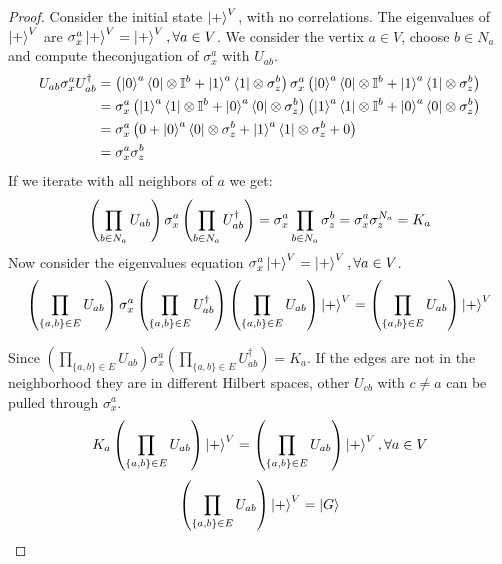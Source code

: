 \documentclass[10pt,a4paper]{book}
\numberwithin{equation}{chapter}
\numberwithin{figure}{chapter}
\numberwithin{table}{chapter}
\begin{document}
\begin{proof}
Consider the initial state $\ket{+}^V$, with no correlations. The eigenvalues of $\ket{+}^V$ are $\sigma^{a}_{x}\ket{+}^V=\ket{+}^V , \forall a \in V$. We consider the vertix $a \in V$, choose $b \in N_{a}$ and compute theconjugation of $\sigma^{a}_{x}$ with $U_{ab}$.
\begin{align}
U_{ab} \sigma^{a}_{x} U^{\dagger}_{ab} &= \left( \ket{0}^{a}\bra{0}\otimes \mathbb{I}^{b} + \ket{1}^{a}\bra{1}\otimes \sigma^{b}_{z} \right) \sigma^{a}_{x} \left(\ket{0}^{a}\bra{0}\otimes \mathbb{I}^{b} + \ket{1}^{a}\bra{1}\otimes \sigma^{b}_{z}\right) \\ 
&= \sigma^{a}_{x} \left(\ket{1}^{a}\bra{1}\otimes \mathbb{I}^{b} + \ket{0}^{a}\bra{0}\otimes \sigma^{b}_{z}\right)\left(\ket{1}^{a}\bra{1}\otimes \mathbb{I}^{b} + \ket{0}^{a}\bra{0}\otimes \sigma^{b}_{z}\right) \\
& = \sigma^{a}_{x} \left( 0 + \ket{0}^{a}\bra{0}\otimes \sigma^{b}_{z} + \ket{1}^{a}\bra{1}\otimes \sigma^{b}_{z} + 0 \right) \\
& = \sigma^{a}_{x}\sigma^{b}_{z}
\end{align}
If we iterate with all neighbors of $a$ we get:
\begin{equation}
\left(\prod_{b \in N_a} U_{ab}\right)\sigma^{a}_{x}\left(\prod_{b \in N_a} U^{\dagger}_{ab}\right)= \sigma^{a}_{x} \prod_{b \in N_a} \sigma^{b}_{z} \\
= \sigma^{a}_{x}\sigma^{N_a}_{z} = K_a
\end{equation}
Now consider the eigenvalues equation $\sigma^{a}_{x}\ket{+}^V=\ket{+}^V , \forall a \in V$.
\begin{equation}
\left(\prod_{\lbrace a,b \rbrace \in E} U_{ab}\right)\sigma^{a}_{x}\left(\prod_{\lbrace a,b \rbrace \in E} U^{\dagger}_{ab}\right)\left(\prod_{\lbrace a,b \rbrace \in E} U_{ab}\right)\ket{+}^{V}= \left(\prod_{\lbrace a,b \rbrace \in E} U_{ab}\right)\ket{+}^V
\end{equation}

Since $\left(\prod_{\lbrace a,b \rbrace \in E} U_{ab}\right)\sigma^{a}_{x}\left(\prod_{\lbrace a,b \rbrace \in E} U^{\dagger}_{ab}\right)=K_a$. If the edges are not in the neighborhood they are in different Hilbert spaces, other $U_{cb}$ with $c\neq a$ can be pulled through $\sigma^{a}_{x}$.
\begin{equation}
K_{a}\left(\prod_{\lbrace a,b \rbrace \in E} U_{ab}\right)\ket{+}^V=\left(\prod_{\lbrace a,b \rbrace \in E} U_{ab}\right)\ket{+}^V , \forall a \in V
\end{equation}
\begin{equation}
\left(\prod_{\lbrace a,b \rbrace \in E} U_{ab}\right)\ket{+}^V=\ket{G}  
\end{equation}
\end{proof}  
  
\end{document}
